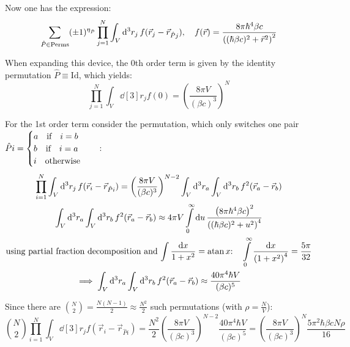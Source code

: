 \documentclass[11pt,a4paper]{scrartcl}
\begin{document}
Now one has the expression:
\begin{equation*}
    \sum_{\hat{P}\in\mathrm{Perms}}(\pm1)^{\eta_{\hat{P}}}\prod_{j=1}^{N}\int_V\dd[3]{r_j}
    f(\vec{r}_{j}-\vec{r}_{\hat{P}j})\qc
    f(\vec{r})=\frac{8\pi\hbar^4\beta c}{\left((\hbar\beta c)^2+\vec{r}^2\right)^2}
\end{equation*}

When expanding this device, the 0th order term is given by the identity
permutation $\hat{P}\equiv\mathrm{Id}$, which yields:
\begin{equation*}
    \prod_{j=1}^{N}\int_{V}\dd[3]{r_j}f(0)=\left(\frac{8\pi V}{(\beta
    c)^3}\right)^N
\end{equation*}

For the 1st order term consider the permutation, which only switches one pair
$\hat{P}i=
\begin{cases}
    a\qif i=b\\
    b\qif i=a\\
    i\qotherwise
\end{cases}
$:
\begin{gather*}
    \prod_{i=1}^{N}\int_{V}\dd[3]{r_j}f(\vec{r}_{i}-\vec{r}_{\hat{P}i})
    =\left(\frac{8\pi V}{(\beta
    c)^3}\right)^{N-2}\int_{V}\dd[3]{r_a}\int_{V}\dd[3]{r_b}f^2(\vec{r}_a-\vec{r}_b)
    \\
    \int_{V}\dd[3]{r_a}\int_{V}\dd[3]{r_b}f^2(\vec{r}_a-\vec{r}_b)\approx
    4\pi V\int\limits_{0}^{\infty}\dd{u}
    \frac{\left(8\pi\hbar^4\beta c\right)^2}{\left((\hbar\beta
    c)^2+u^2\right)^4} \\
    \qq*{using partial fraction decomposition and
        $\int\frac{\dd{x}}{1+x^2}=\atan x$:}
    \int\limits_{0}^{\infty}\frac{\dd{x}}{\left(1+x^2\right)^4}=\frac{5\pi}{32}\\
    \implies
    \int_{V}\dd[3]{r_a}\int_{V}\dd[3]{r_b}f^2(\vec{r}_a-\vec{r}_b)\approx
    \frac{40\pi^4\hbar V}{(\beta c)^5}
\end{gather*}

Since there are $\binom{N}{2}=\frac{N(N-1)}{2}\approx\frac{N^2}{2}$ such
permutations (with $\rho=\frac{N}{V}$):
\begin{equation*}
    \binom{N}{2}\prod_{i=1}^{N}\int_{V}\dd[3]{r_j}f(\vec{r}_{i}-\vec{r}_{\hat{P}i})
    =\frac{N^2}{2}\left(\frac{8\pi V}{(\beta
    c)^3}\right)^{N-2}\frac{40\pi^4\hbar V}{(\beta c)^5}
    =\left(\frac{8\pi V}{(\beta c)^3}\right)^{N}\frac{5\pi^2\hbar\beta c
    N\rho}{16}
\end{equation*}
\end{document}

